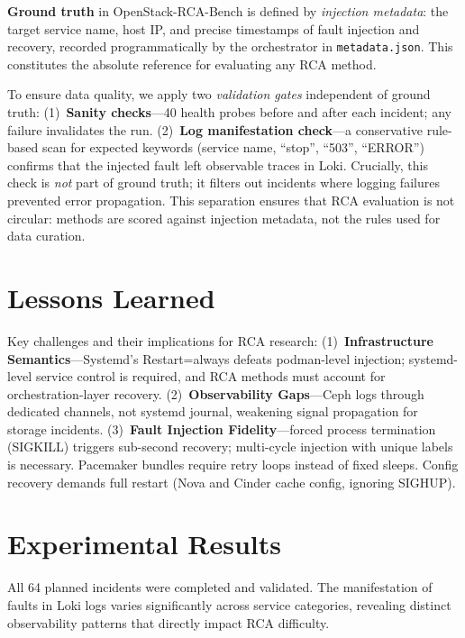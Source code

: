 \documentclass[sigconf,review]{acmart}
\begin{document}
\textbf{Ground truth} in OpenStack-RCA-Bench is defined by \textit{injection metadata}: the target service name, host IP, and precise timestamps of fault injection and recovery, recorded programmatically by the orchestrator in \texttt{metadata.json}. This constitutes the absolute reference for evaluating any RCA method.

To ensure data quality, we apply two \textit{validation gates} independent of ground truth: (1)~\textbf{Sanity checks}---40 health probes before and after each incident; any failure invalidates the run. (2)~\textbf{Log manifestation check}---a conservative rule-based scan for expected keywords (service name, ``stop'', ``503'', ``ERROR'') confirms that the injected fault left observable traces in Loki. Crucially, this check is \textit{not} part of ground truth; it filters out incidents where logging failures prevented error propagation. This separation ensures that RCA evaluation is not circular: methods are scored against injection metadata, not the rules used for data curation.

\section{Lessons Learned}
\label{sec:challenges}

Key challenges and their implications for RCA research: (1)~\textbf{Infrastructure Semantics}---Systemd's Restart=always defeats podman-level injection; systemd-level service control is required, and RCA methods must account for orchestration-layer recovery. (2)~\textbf{Observability Gaps}---Ceph logs through dedicated channels, not systemd journal, weakening signal propagation for storage incidents. (3)~\textbf{Fault Injection Fidelity}---forced process termination (SIGKILL) triggers sub-second recovery; multi-cycle injection with unique labels is necessary. Pacemaker bundles require retry loops instead of fixed sleeps. Config recovery demands full restart (Nova and Cinder cache config, ignoring SIGHUP).

\section{Experimental Results}
\label{sec:experiments}

All 64 planned incidents were completed and validated. The manifestation of faults in Loki logs varies significantly across service categories, revealing distinct observability patterns that directly impact RCA difficulty.
\end{document}
